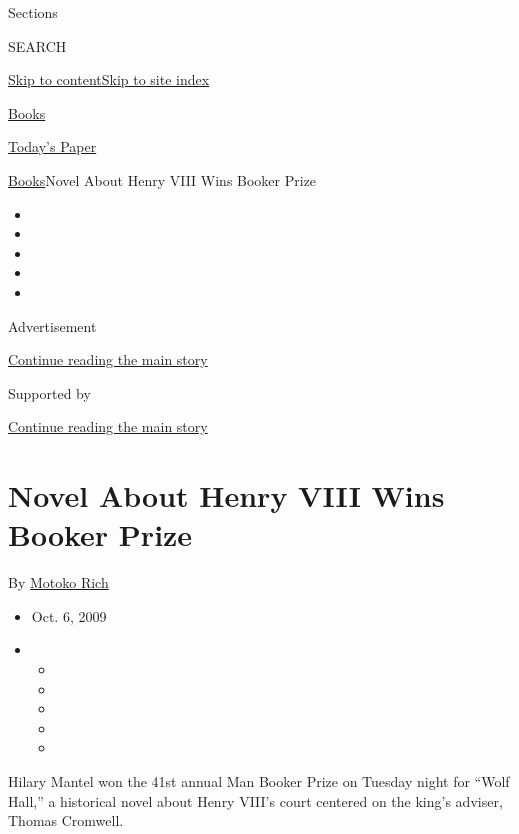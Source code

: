 Sections

SEARCH

\protect\hyperlink{site-content}{Skip to
content}\protect\hyperlink{site-index}{Skip to site index}

\href{https://www.nytimes.com/section/books}{Books}

\href{https://myaccount.nytimes.com/auth/login?response_type=cookie\&client_id=vi}{}

\href{https://www.nytimes.com/section/todayspaper}{Today's Paper}

\href{/section/books}{Books}\textbar{}Novel About Henry VIII Wins Booker
Prize

\begin{itemize}
\item
\item
\item
\item
\item
\end{itemize}

Advertisement

\protect\hyperlink{after-top}{Continue reading the main story}

Supported by

\protect\hyperlink{after-sponsor}{Continue reading the main story}

\hypertarget{novel-about-henry-viii-wins-booker-prize}{%
\section{Novel About Henry VIII Wins Booker
Prize}\label{novel-about-henry-viii-wins-booker-prize}}

By \href{https://www.nytimes.com/by/motoko-rich}{Motoko Rich}

\begin{itemize}
\item
  Oct. 6, 2009
\item
  \begin{itemize}
  \item
  \item
  \item
  \item
  \item
  \end{itemize}
\end{itemize}

Hilary Mantel won the 41st annual Man Booker Prize on Tuesday night for
``Wolf Hall,'' a historical novel about Henry VIII's court centered on
the king's adviser, Thomas Cromwell.

